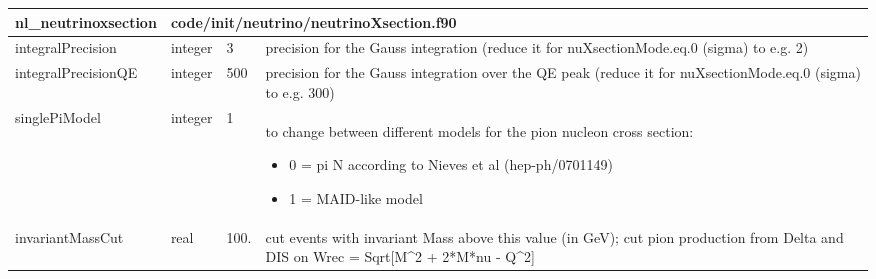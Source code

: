 \documentclass{article}
\begin{document}
\begin{longtable}{llll}
\toprule
\textbf{\large{nl\_neutrinoxsection}} & \multicolumn{3}{l}{\footnotesize{code/init/neutrino/neutrinoXsection.f90}}\\*
\midrule
\endfirsthead
\midrule
\endhead
integralPrecision & \begin{minipage}[t]{2cm}integer\end{minipage} & \begin{minipage}[t]{2cm}3\end{minipage} & \begin{minipage}[t]{12cm}precision for the Gauss integration (reduce it for nuXsectionMode.eq.0 (sigma) to e.g. 2)\end{minipage}\\*
\midrule
integralPrecisionQE & \begin{minipage}[t]{2cm}integer\end{minipage} & \begin{minipage}[t]{2cm}500\end{minipage} & \begin{minipage}[t]{12cm}precision for the Gauss integration over the QE peak (reduce it for nuXsectionMode.eq.0 (sigma) to e.g. 300)\end{minipage}\\*
\midrule
singlePiModel & \begin{minipage}[t]{2cm}integer\end{minipage} & \begin{minipage}[t]{2cm}1\end{minipage} & \begin{minipage}[t]{12cm}to change between different models for the pion nucleon cross section:\begin{itemize}\leftmargin0em\itemindent0pt\item 0 = pi N according to Nieves et al (hep-ph/0701149)\item 1 = MAID-like model\end{itemize}\end{minipage}\\*
\midrule
invariantMassCut & \begin{minipage}[t]{2cm}real\end{minipage} & \begin{minipage}[t]{2cm}100.\end{minipage} & \begin{minipage}[t]{12cm}cut events with invariant Mass above this value (in GeV); cut pion production from Delta and DIS on Wrec = Sqrt[M\^{}2 + 2*M*nu - Q\^{}2]\end{minipage}\\*

\end{longtable}
\end{document}
